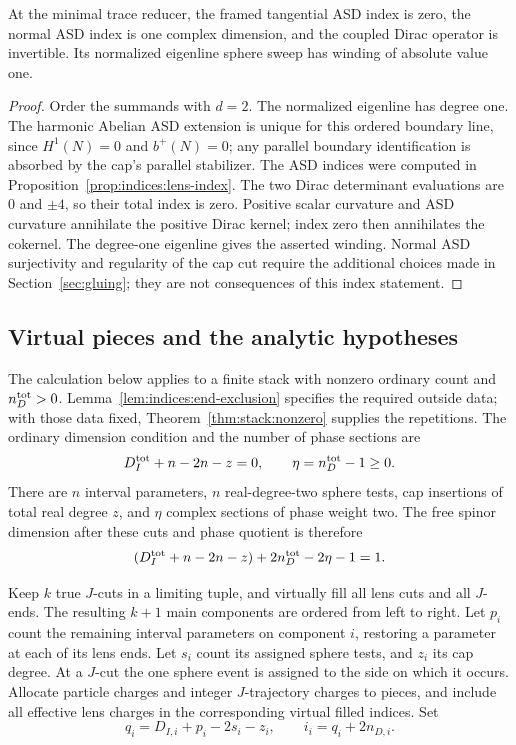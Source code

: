 \begin{corollary}\label{cor:indices:trace-minimum}
At the minimal trace reducer, the framed tangential ASD index is zero,
the normal ASD index is one complex dimension, and the coupled Dirac
operator is invertible.  Its normalized eigenline sphere sweep has winding
of absolute value one.
\end{corollary}
\begin{proof}
Order the summands with $d=2$.  The normalized eigenline has degree one.
The harmonic Abelian ASD extension is unique for this ordered boundary
line, since $H^1(N)=0$ and $b^+(N)=0$; any parallel boundary identification
is absorbed by the cap's parallel stabilizer.  The ASD indices were
computed in Proposition~\ref{prop:indices:lens-index}.  The two Dirac
determinant evaluations are $0$ and $\pm4$, so their total index is zero.
Positive scalar curvature and ASD curvature annihilate the positive
Dirac kernel; index zero then annihilates the cokernel.  The degree-one
eigenline gives the asserted winding.  Normal ASD surjectivity and
regularity of the cap cut require the additional choices made in
Section~\ref{sec:gluing}; they are not consequences of this index statement.
\end{proof}

\subsection{Virtual pieces and the analytic hypotheses}

The calculation below applies to a finite stack with nonzero ordinary
count and $n_D^{\rm tot}>0$.  Lemma~\ref{lem:indices:end-exclusion}
specifies the required outside data; with those data fixed,
Theorem~\ref{thm:stack:nonzero} supplies the repetitions.
The ordinary dimension condition and the number of phase sections are
\begin{equation}\label{eq:indices:phase-count}
 D_I^{\rm tot}+n-2n-z=0,\qquad
 \eta=n_D^{\rm tot}-1\ge0.
\end{equation}
There are $n$ interval parameters, $n$ real-degree-two sphere tests, cap
insertions of total real degree $z$, and $\eta$ complex sections of phase
weight two.  The free spinor dimension after these cuts and phase quotient
is therefore
\[
 (D_I^{\rm tot}+n-2n-z)+2n_D^{\rm tot}-2\eta-1=1.
\]

Keep $k$ true $J$-cuts in a limiting tuple, and virtually fill all lens
cuts and all $J$-ends.  The resulting $k+1$ main components are ordered
from left to right.  Let $p_i$ count the remaining interval parameters on
component $i$, restoring a parameter at each of its lens ends.  Let $s_i$
count its assigned sphere tests, and $z_i$ its cap degree.  At a $J$-cut the
one sphere event is assigned to the side on which it occurs.  Allocate
particle charges and integer $J$-trajectory charges to pieces, and include
all effective lens charges in the corresponding virtual filled indices.
Set
\begin{equation}\label{eq:indices:q-and-i}
 q_i=D_{I,i}+p_i-2s_i-z_i,\qquad i_i=q_i+2n_{D,i}.
\end{equation}

